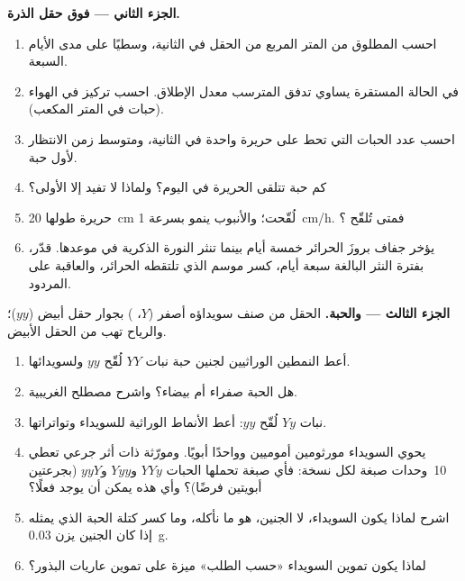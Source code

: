 \begin{problem}
\medskip
\noindent\textbf{الجزء الثاني ---  فوق حقل الذرة.}
\begin{enumerate}[resume]
  \item احسب  المطلوق من المتر المربع من الحقل في الثانية،
        وسطيًا على مدى الأيام السبعة.
  \item في الحالة المستقرة يساوي تدفق  المترسب معدل الإطلاق.
        احسب تركيز  في الهواء (حبات في المتر المكعب).
  \item احسب عدد الحبات التي تحط على حريرة واحدة في الثانية،
        ومتوسط زمن الانتظار لأول حبة.
  \item كم حبة تتلقى الحريرة في اليوم؟ ولماذا لا تفيد إلا الأولى؟
  \item حريرة طولها \qty{20}{cm} لُقّحت؛ والأنبوب ينمو بسرعة
        \qty{1}{cm/h}. فمتى تُلقّح ؟
  \item يؤخر جفاف بروزَ الحرائر خمسة أيام بينما تنثر النورة
        الذكرية في موعدها. قدّر، بفترة النثر البالغة سبعة أيام،
        كسر موسم  الذي تلتقطه الحرائر، والعاقبة على المردود.
\end{enumerate}

\medskip
\noindent\textbf{الجزء الثالث ---  والحبة.}
الحقل من صنف سويداؤه أصفر ($Y$، ) بجوار حقل أبيض ($yy$)؛
والرياح تهب من الحقل الأبيض.
\begin{enumerate}[resume]
  \item أعط النمطين الوراثيين لجنين حبة نبات $YY$ لُقّح  $yy$
        ولسويدائها.
  \item هل الحبة صفراء أم بيضاء؟ واشرح مصطلح الغريبية.
  \item نبات $Yy$ لُقّح  $yy$: أعط الأنماط الوراثية للسويداء
        وتواتراتها.
  \item يحوي السويداء مورثومين أموميين وواحدًا أبويًا.
        ومورّثة ذات أثر جرعي تعطي 10~وحدات صبغة لكل نسخة: فأي صبغة
        تحملها الحبات $YYy$ و$Yyy$ و$yyY$
        (بجرعتين أبويتين فرضًا)؟ وأي هذه يمكن أن يوجد فعلًا؟
  \item اشرح لماذا يكون السويداء، لا الجنين، هو ما نأكله، وما كسر
        كتلة الحبة الذي يمثله إذا كان الجنين يزن \qty{0.03}{g}.
  \item لماذا يكون تموين السويداء «حسب الطلب» ميزة على تموين عاريات
        البذور؟
\end{enumerate}


\end{problem}
